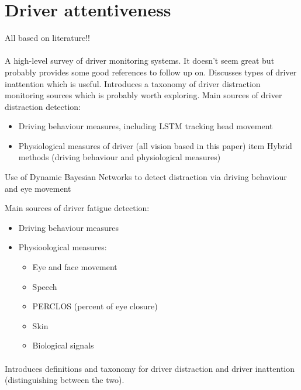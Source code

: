 \documentclass[11pt, parskip=half*,twoside=false]{scrbook}
\begin{document}
\section{Driver attentiveness}
All based on literature!!

\paragraph{\citep{koesdwiadyRecentTrendsDriver2017}} A high-level survey of driver monitoring systems. It doesn't seem great but probably provides some good references to follow up on. Discusses types of driver inattention which is useful. Introduces a taxonomy of driver distraction monitoring sources which is probably worth exploring. Main sources of driver distraction detection:
\begin{itemize}
	\item Driving behaviour measures, including LSTM tracking head movement \citep{wollmerOnlineDriverDistraction2011}
	\item Physiological measures of driver (all vision based in this paper)
	item Hybrid methods (driving behaviour and physiological measures)
\end{itemize}

Use of Dynamic Bayesian Networks to detect distraction via driving behaviour and eye movement \citep{liangHybridBayesianNetwork2014}

Main sources of driver fatigue detection:
\begin{itemize}
	\item Driving behaviour measures
	\item Physioological measures:
	\begin{itemize}
		\item Eye and face movement
		\item Speech
		\item PERCLOS (percent of eye closure)
		\item Skin \citep{kurianDrowsinessDetectionUsing2014a}
		\item Biological signals \citep{zhangAutomatedDetectionDriver2014}
	\end{itemize}
\end{itemize}

\paragraph{\citep{reganDriverDistractionDriver2011}} Introduces definitions and taxonomy for driver distraction and driver inattention (distinguishing between the two).
\end{document}
